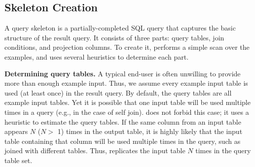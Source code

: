 \subsection{Skeleton Creation}
\label{sec:skeleton}



A query skeleton is a partially-completed SQL query
that captures the basic structure of the result query.
It consists of three parts: query tables,
join conditions, and projection columns.
To create it, \ourtool performs a simple scan over
the examples, and uses several heuristics to determine
each part.



\vspace{1mm}
{\textbf{Determining query tables.}} 
A typical end-user is often unwilling to provide more than enough
example input. Thus, we assume every example input table
is used (at least once) in the result query.
By default, the query tables are all example input tables.
Yet it is possible that one input table will be
used multiple times in a query (e.g., in the case of
self join). \ourtool does not forbid this case;
it uses a heuristic to estimate the query tables.
If the same column from an input table appears $N$ ($N >$ 1) times in the
output table, it is highly likely that the input table containing
that column will be used multiple times in the query, such
as joined with different tables.
Thus, \ourtool replicates the input table $N$ times in
the query table set.




